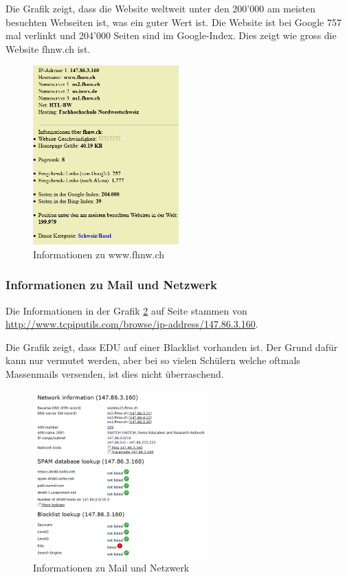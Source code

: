\documentclass[a4paper,11pt]{scrartcl}
\begin{document}
Die Grafik zeigt, dass die Website weltweit unter den 200'000 am meisten besuchten Webseiten ist, was ein guter Wert ist. Die Website ist bei Google 757 mal verlinkt und 204'000 Seiten sind im Google-Index. Dies zeigt wie gross die Website fhnw.ch ist.
\begin{figure}[p]
	\centering
	\includegraphics[width=0.5\textwidth]{../aufg5/website_infos.png}
	\caption{Informationen zu www.fhnw.ch}
	\label{fig:website_infos}
\end{figure}

\subsubsection{Informationen zu Mail und Netzwerk}
Die Informationen in der Grafik \ref{fig:iprange_infos} auf Seite \pageref{fig:iprange_infos} stammen von \url{http://www.tcpiputils.com/browse/ip-address/147.86.3.160}.

Die Grafik zeigt, dass EDU auf einer Blacklist vorhanden ist. Der Grund dafür kann nur vermutet werden, aber bei so vielen Schülern welche oftmals Massenmails versenden, ist dies nicht überraschend.
\begin{figure}[p]
	\centering
	\includegraphics[width=0.6\textwidth]{../aufg5/iprange_infos.png}
	\caption{Informationen zu Mail und Netzwerk}
	\label{fig:iprange_infos}
\end{figure}
\end{document}

